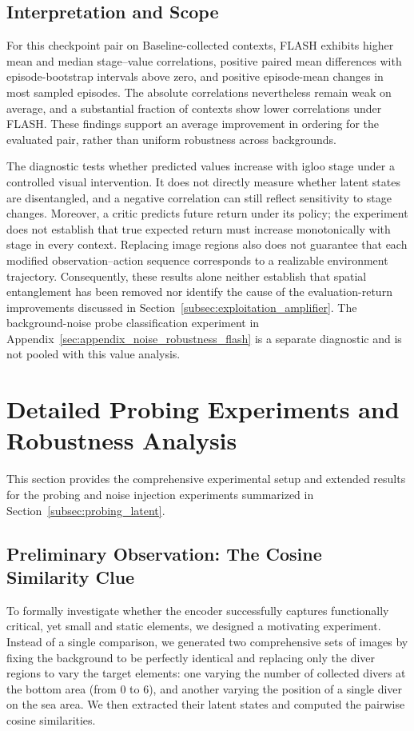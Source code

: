 \documentclass{article} %
\begin{document}
\subsection{Interpretation and Scope}
For this checkpoint pair on Baseline-collected contexts, FLASH exhibits higher mean and median stage--value correlations, positive paired mean differences with episode-bootstrap intervals above zero, and positive episode-mean changes in most sampled episodes. The absolute correlations nevertheless remain weak on average, and a substantial fraction of contexts show lower correlations under FLASH. These findings support an average improvement in ordering for the evaluated pair, rather than uniform robustness across backgrounds.

The diagnostic tests whether predicted values increase with igloo stage under a controlled visual intervention. It does not directly measure whether latent states are disentangled, and a negative correlation can still reflect sensitivity to stage changes. Moreover, a critic predicts future return under its policy; the experiment does not establish that true expected return must increase monotonically with stage in every context. Replacing image regions also does not guarantee that each modified observation--action sequence corresponds to a realizable environment trajectory. Consequently, these results alone neither establish that spatial entanglement has been removed nor identify the cause of the evaluation-return improvements discussed in Section~\ref{subsec:exploitation_amplifier}. The background-noise probe classification experiment in Appendix~\ref{sec:appendix_noise_robustness_flash} is a separate diagnostic and is not pooled with this value analysis.

\section{Detailed Probing Experiments and Robustness Analysis}
\label{sec:appendix_detailed_probing}
This section provides the comprehensive experimental setup and extended results for the probing and noise injection experiments summarized in Section~\ref{subsec:probing_latent}.

\subsection{Preliminary Observation: The Cosine Similarity Clue}
To formally investigate whether the encoder successfully captures functionally critical, yet small and static elements, we designed a motivating experiment. Instead of a single comparison, we generated two comprehensive sets of images by fixing the background to be perfectly identical and replacing only the diver regions to vary the target elements: one varying the number of collected divers at the bottom area (from 0 to 6), and another varying the position of a single diver on the sea area. We then extracted their latent states and computed the pairwise cosine similarities.
\end{document}
